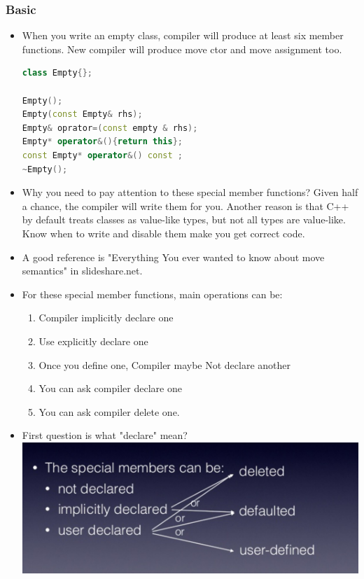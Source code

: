 \documentclass[a4paper,11pt,twoside]{book}
\begin{document}
\subsubsection{Basic}

\begin{itemize}

\item When you write an empty class, compiler will produce at least six member functions.  New compiler will produce move ctor and move assignment too.
\begin{lstlisting}[frame=single, language=c++]
class Empty{};

Empty();
Empty(const Empty& rhs);
Empty& oprator=(const empty & rhs);
Empty* operator&(){return this};
const Empty* operator&() const ;
~Empty();
\end{lstlisting}

\item Why you need to pay attention to these special member functions?  Given half a chance, the compiler will write them for you. Another reason is that C++ by default treats classes as value-like types, but not all types are value-like. Know when to write and disable them make you get correct code.

\item A good reference is "Everything You ever wanted to know about move semantics" in slideshare.net.

\item For these special member functions, main operations can be:
\begin{enumerate}
\item Compiler implicitly declare one
\item Use explicitly declare one
\item Once you define one, Compiler maybe Not declare another
\item You can ask compiler declare one
\item You can ask compiler delete one.
\end{enumerate}

\item First question is what "declare" mean?  \\
\includegraphics[scale=0.6]{pics/sm1.png} \newline


\end{itemize}
\end{document}
